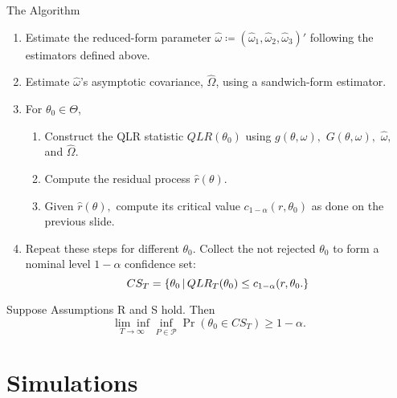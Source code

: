 \documentclass[smaller, aspectratio=169]{beamer}
\begin{document}
\begin{frame}[c]{The Algorithm}
    \bigskip
  \begin{enumerate}
    \item Estimate the reduced-form parameter $\widehat{\omega} \coloneqq \left(\widehat{\omega}_{1}, \widehat{\omega}_{2}, \widehat{\omega}_{3}\right)'$ following the estimators defined above.
      \bigskip
%
    \item Estimate $\widehat{\omega}$'s asymptotic covariance, $\widehat{\Omega}$, using a sandwich-form estimator.
      \bigskip
  
    \item For $\theta_{0}\in \Theta$, 
          \medskip
%
    \begin{enumerate}
      \item Construct the QLR statistic $QLR(\theta_{0})$ using $g(\theta, \omega), $ $G(\theta, \omega), $ $\widehat{\omega}, $ and $\widehat{\Omega}.$
          \medskip
%
      \item Compute the residual process $\widehat{r}(\theta)$.
          \medskip
  
      \item Given $\widehat{r}(\theta), $ compute its critical value $c_{1-\alpha}(r, \theta_{0})$ as done on the previous slide.
%
    \end{enumerate}
      \bigskip
%
  \item Repeat these steps for different $\theta_{0}$. Collect the not rejected $\theta_{0}$ to form a nominal level $1-\alpha $ confidence set: 
%
    \begin{equation*}
      CS_{T} = \left\lbrace \theta_{0} \,\middle\vert\, QLR_{T}(\theta_{0})\leq c_{1-\alpha}(r, \theta_{0}. \right\rbrace
    \end{equation*}
  \end{enumerate}

\begin{theorem}
  \label{Lemma CS}
  Suppose Assumptions R and S hold. Then 
%
  \begin{equation*} 
    \underset{T\rightarrow \infty}{\lim \inf}\underset{P\in \mathcal{P}}{\inf}\Pr \left( \theta_{0}\in CS_{T}\right) \geq 1-\alpha .
  \end{equation*}
\end{theorem}

\end{frame}

\section{Simulations}
\end{document}
